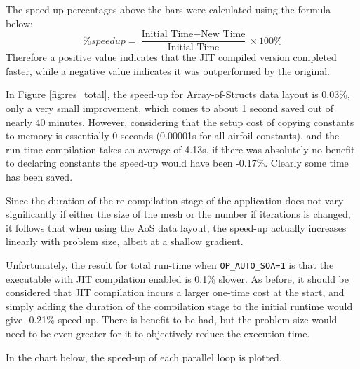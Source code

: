 \noindent The speed-up percentages above the bars were calculated using the formula below:
\[ \%speedup = \frac{\text{Initial Time}-\text{New Time}}{\text{Initial Time}} \times 100\%\]
Therefore a positive value indicates that the JIT compiled version completed faster, while a negative value indicates it was outperformed by the original.


\noindent In Figure \ref{fig:res_total}, the speed-up for Array-of-Structs data layout is 0.03\%, only a very small improvement, which comes to about 1 second saved out of nearly 40 minutes. However, considering that the setup cost of copying constants to memory is essentially 0 seconds (0.00001s for all airfoil constants), and the run-time compilation takes an average of 4.13s, if there was absolutely no benefit to declaring constants the speed-up would have been -0.17\%. Clearly some time has been saved.
\par
Since the duration of the re-compilation stage of the application does not vary significantly if either the size of the mesh or the number if iterations is changed, it follows that when using the AoS data layout, the speed-up actually increases linearly with problem size, albeit at a shallow gradient.
\par
Unfortunately, the result for total run-time when \verb|OP_AUTO_SOA=1| is that the executable with JIT compilation enabled is 0.1\% slower. As before, it should be considered that JIT compilation incurs a larger one-time cost at the start, and simply adding the duration of the compilation stage to the initial runtime would give -0.21\% speed-up. There is benefit to be had, but the problem size would need to be even greater for it to objectively reduce the execution time.\par
\vfill
\noindent In the chart below, the speed-up of each parallel loop is plotted.
